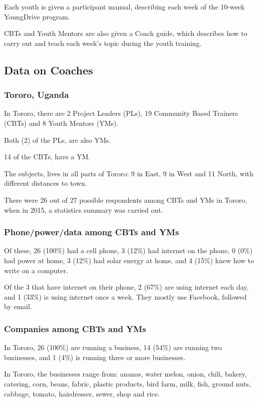Each youth is given a participant manual, describing each week of the 10-week YoungDrive program.

CBTs and Youth Mentors are also given a Coach guide, which describes how to carry out and teach each week's topic during the youth training.

\subsection{Data on Coaches}

\subsubsection{Tororo, Uganda}
In Tororo, there are 2 Project Leaders (PLs), 19 Community Based Trainers (CBTs) and 8 Youth Mentors (YMs).

Both (2) of the PLs, are also YMs.

14 of the CBTs, have a YM.

The subjects, lives in all parts of Tororo: 9 in East, 9 in West and 11 North, with different distances to town.

There were 26 out of 27 possible respondents among CBTs and YMs in Tororo, when in 2015, a statistics summary was carried out.

\subsubsection{Phone/power/data among CBTs and YMs}

Of these, 26 (100\%) had a cell phone, 3 (12\%) had internet on the phone, 0 (0\%) had power at home, 3 (12\%) had solar energy at home, and 4 (15\%) knew how to write on a computer.

Of the 3 that have internet on their phone, 2 (67\%) are using internet each day, and 1 (33\%) is using internet once a week. They mostly use Facebook, followed by email.

\subsubsection{Companies among CBTs and YMs}
In Tororo, 26 (100\%) are running a business, 14 (54\%) are running two businesses, and 1 (4\%) is running three or more businesses.

In Tororo, the businesses range from: ananas, water melon, onion, chili, bakery, catering, corn, beans, fabric, plastic products, bird farm, milk, fish, ground nuts, cabbage, tomato, hairdresser, sewer, shop and rice.

